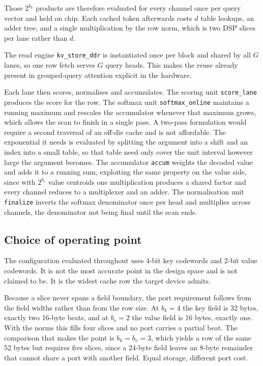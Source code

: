 Those $2^{b_k}$ products are therefore evaluated for every channel once
per query vector and held on chip. Each cached token afterwards costs
$d$ table lookups, an adder tree, and a single multiplication by the row
norm, which is two DSP slices per lane rather than $d$.

The read engine \texttt{kv\_store\_ddr} is instantiated once per block
and shared by all $G$ lanes, so one row fetch serves $G$ query heads.
This makes the reuse already present in grouped-query attention explicit
in the hardware.

Each lane then scores, normalises and accumulates. The scoring unit
\texttt{score\_lane} produces the score for the row. The softmax unit
\texttt{softmax\_online} maintains a running maximum and rescales the
accumulator whenever that maximum grows, which allows the scan to finish
in a single pass. A two-pass formulation would require a second
traversal of an off-die cache and is not affordable. The exponential it
needs is evaluated by splitting the argument into a shift and an index
into a small table, so that table need only cover the unit interval
however large the argument becomes. The accumulator \texttt{accum}
weights the decoded value and adds it to a running sum, exploiting the
same property on the value side, since with $2^{b_v}$ value centroids
one multiplication produces a shared factor and every channel reduces to
a multiplexer and an adder. The normalisation unit \texttt{finalize}
inverts the softmax denominator once per head and multiplies across
channels, the denominator not being final until the scan ends.

\subsection{Choice of operating point}
\label{sec:operating-point}

The configuration evaluated throughout uses 4-bit key codewords and 2-bit
value codewords. It is not the most accurate point in the design space
and is not claimed to be. It is the widest cache row the target device
admits.

Because a slice never spans a field boundary, the port requirement
follows from the field widths rather than from the row size. At $b_k{=}4$
the key field is 32 bytes, exactly two 16-byte beats, and at $b_v{=}2$
the value field is 16 bytes, exactly one. With the norms this fills four
slices and no port carries a partial beat. The comparison that makes the
point is $b_k{=}b_v{=}3$, which yields a row of the same 52 bytes but
requires five slices, since a 24-byte field leaves an 8-byte remainder
that cannot share a port with another field. Equal storage, different
port cost.

